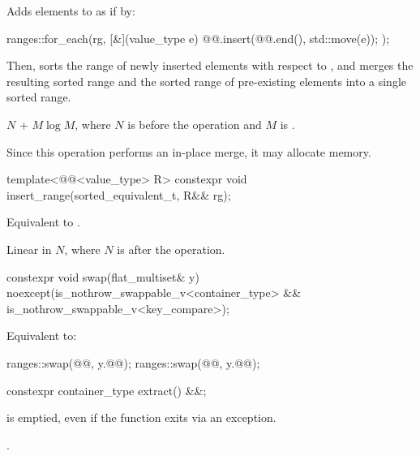 \begin{itemdescr}
\pnum
\effects
Adds elements to  as if by:
\begin{codeblock}
ranges::for_each(rg, [&](value_type e) {
  @@.insert(@@.end(), std::move(e));
});
\end{codeblock}
Then, sorts the range of newly inserted elements with respect to ,
and merges the resulting sorted range and
the sorted range of pre-existing elements into a single sorted range.

\pnum
\complexity
$N$ + $M \log M$, where $N$ is  before the operation and $M$
is .

\pnum
\remarks
Since this operation performs an in-place merge,
it may allocate memory.
\end{itemdescr}

%
\begin{itemdecl}
template<@@<value_type> R>
  constexpr void insert_range(sorted_equivalent_t, R&& rg);
\end{itemdecl}

\begin{itemdescr}
\pnum
\effects
Equivalent to .

\pnum
\complexity
Linear in $N$, where $N$ is  after the operation.
\end{itemdescr}

%
\begin{itemdecl}
constexpr void swap(flat_multiset& y)
  noexcept(is_nothrow_swappable_v<container_type> &&
           is_nothrow_swappable_v<key_compare>);
\end{itemdecl}

\begin{itemdescr}
\pnum
\effects
Equivalent to:
\begin{codeblock}
ranges::swap(@@, y.@@);
ranges::swap(@@, y.@@);
\end{codeblock}
\end{itemdescr}

%
\begin{itemdecl}
constexpr container_type extract() &&;
\end{itemdecl}

\begin{itemdescr}
\pnum
\ensures
{} is emptied, even if the function exits via an exception.

\pnum
\returns
{}.
\end{itemdescr}

